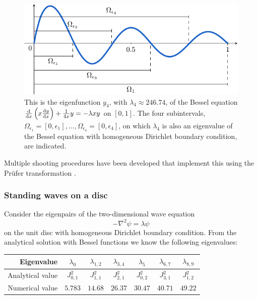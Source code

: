 \begin{figure}
  \begin{center}
    \includegraphics[width=.8\textwidth]{img/chapter3/counting/sturm-liouville.pdf}
    \caption{\label{fig:sturm-liouville} This is the eigenfunction $y_4$, with $\lambda_4 \approx 246.74$, of the Bessel equation $ \dv{x} \left( x \dv{y}{x} \right) + \frac{1}{4x} y = -\lambda x y $ on $[0, 1]$. The four subintervals, $\Omega_{\epsilon_1} = [0, \epsilon_1],\dots, \Omega_{\epsilon_4} = [0, \epsilon_4]$, on which $\lambda_4$ is also an eigenvalue of the Bessel equation with homogeneous Dirichlet boundary condition, are indicated.}
  \end{center}
\end{figure}

Multiple shooting procedures \cite{baeyens_fast_2020,ledoux_matslise_2016,ixaru_cp_2000} have been developed that implement this using the Prüfer transformation \cite{pruefer_neue_1926}.

\subsubsection{Standing waves on a disc}\label{sec:c3_standing_waves_on_disc}

Consider the eigenpairs of the two-dimensional wave equation
$$
  -\nabla^2 \psi = \lambda \psi
$$
on the unit disc with homogeneous Dirichlet boundary condition. From the analytical solution with Bessel functions we know the following eigenvalues:
\begin{center}
  \bgroup
  \def\arraystretch{1.5}
  \begin{tabular}{r|cccccc}
    Eigenvalue       & $\lambda_0$ & $\lambda_{1,2}$ & $\lambda_{3,4}$ & $\lambda_{5}$ & $\lambda_{6,7}$ & $\lambda_{8,9}$ \\ \hline\hline
    Analytical value & $J_{0,1}^2$ & $J_{1,1}^2$     & $J_{2,1}^2$     & $J_{0,2}^2$   & $J_{3,1}^2$     & $J_{1,2}^2$     \\ \hline
    Numerical value  & $5.783$     & $14.68$         & $26.37$         & $30.47$       & $40.71$         & $49.22$
  \end{tabular}
  \egroup
\end{center}
\vspace{1em}

